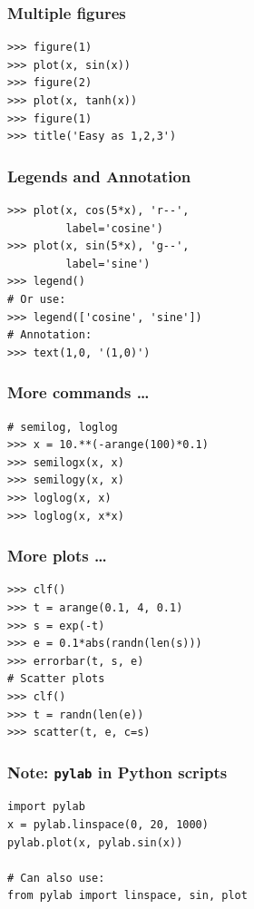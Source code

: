 \documentclass[14pt,compress]{beamer}
\newcommand{\typ}[1]{\texttt{#1}}
\begin{document}
\begin{frame}[fragile]
    \frametitle{Multiple figures}

\begin{lstlisting}
>>> figure(1)
>>> plot(x, sin(x))
>>> figure(2)
>>> plot(x, tanh(x))
>>> figure(1)
>>> title('Easy as 1,2,3')
\end{lstlisting}
    
\end{frame}

\begin{frame}[fragile]
  \frametitle{Legends and Annotation}
\begin{lstlisting}
>>> plot(x, cos(5*x), 'r--', 
         label='cosine')
>>> plot(x, sin(5*x), 'g--', 
         label='sine')
>>> legend() 
# Or use:
>>> legend(['cosine', 'sine'])
# Annotation:
>>> text(1,0, '(1,0)')
\end{lstlisting}
\end{frame}

\begin{frame}[fragile]
    \frametitle{More commands \ldots}
    \begin{lstlisting}
# semilog, loglog 
>>> x = 10.**(-arange(100)*0.1)
>>> semilogx(x, x)
>>> semilogy(x, x)
>>> loglog(x, x)
>>> loglog(x, x*x)
    \end{lstlisting}
\end{frame}

\begin{frame}[fragile]
    \frametitle{More plots \ldots}
    \begin{lstlisting}
>>> clf()
>>> t = arange(0.1, 4, 0.1)
>>> s = exp(-t)
>>> e = 0.1*abs(randn(len(s)))
>>> errorbar(t, s, e)
# Scatter plots
>>> clf()
>>> t = randn(len(e))
>>> scatter(t, e, c=s)
    \end{lstlisting}
\end{frame}

\begin{frame}[fragile]
    \frametitle{Note: \typ{pylab} in Python scripts}
\begin{lstlisting}
import pylab
x = pylab.linspace(0, 20, 1000)
pylab.plot(x, pylab.sin(x))

# Can also use:
from pylab import linspace, sin, plot
\end{lstlisting}
\end{frame}

\end{document}
